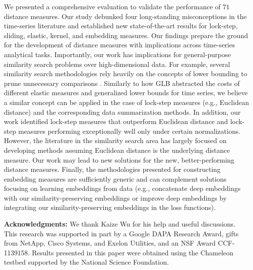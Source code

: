 \documentclass[11pt]{article}
\begin{document}
We presented a comprehensive evaluation to validate the performance of $71$ distance measures. Our study debunked four long-standing misconceptions in the time-series literature and established new state-of-the-art results for lock-step, sliding, elastic, kernel, and embedding measures. Our findings prepare the ground for the development of distance measures with implications across time-series analytical tasks. Importantly, our work has implications for general-purpose similarity search problems over high-dimensional data. For example, several similarity search methodologies rely heavily on the concepts of lower bounding to prune unnecessary comparisons \cite{paparrizos2022fast,echihabi2018lernaean}. Similarly to how GLB abstracted the costs of different elastic measures and generalized lower bounds for time series, we believe a similar concept can be applied in the case of lock-step measures (e.g., Euclidean distance) and the corresponding data summarization methods. In addition, our work identified lock-step measures that outperform Euclidean distance and lock-step measures performing exceptionally well only under certain normalizations. However, the literature in the similarity search area has largely focused on developing methods assuming Euclidean distance is the underlying distance measure. Our work may lead to new solutions for the new, better-performing distance measures. Finally, the methodologies presented for constructing embedding measures are sufficiently generic and can complement solutions focusing on learning embeddings from data \cite{wang2023seanet} (e.g., concatenate deep embeddings with our similarity-preserving embeddings or improve deep embeddings by integrating our similarity-preserving embeddings in the loss functions).

{\scriptsize  \noindent \textbf{Acknowledgments: }
We thank Kaize Wu for his help and useful discussions. This research was supported in part by a Google  DAPA  Research  Award, gifts from NetApp, Cisco Systems, and Exelon Utilities, and an NSF Award CCF-1139158. Results presented in this paper were obtained using the Chameleon testbed supported by the National Science Foundation.}

%
%
%
% 
%
%
%
%
% 
%
%
%


% 


\footnotesize 
\end{document}
